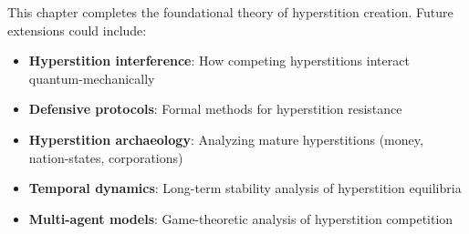 \begin{tcolorbox}[colback=green!5!white,colframe=green!50!black,title=\textbf{Handoff: Next Steps}]
This chapter completes the foundational theory of hyperstition creation. Future extensions could include:
\begin{itemize}
    \item \textbf{Hyperstition interference}: How competing hyperstitions interact quantum-mechanically
    \item \textbf{Defensive protocols}: Formal methods for hyperstition resistance
    \item \textbf{Hyperstition archaeology}: Analyzing mature hyperstitions (money, nation-states, corporations)
    \item \textbf{Temporal dynamics}: Long-term stability analysis of hyperstition equilibria
    \item \textbf{Multi-agent models}: Game-theoretic analysis of hyperstition competition
\end{itemize}
\end{tcolorbox}

